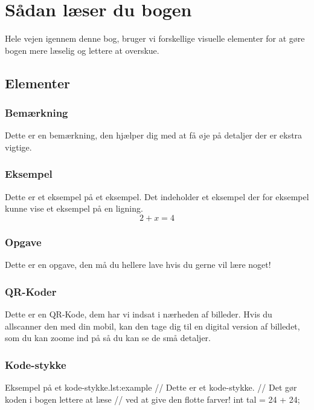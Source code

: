\cleardoublepage
\chapter{Sådan læser du bogen}
Hele vejen igennem denne bog, bruger vi forskellige visuelle elementer for at gøre bogen mere læselig og lettere at overskue.

\section{Elementer}

\subsection{Bemærkning}
\begin{remark}
	Dette er en bemærkning, den hjælper dig med at få øje på detaljer der er ekstra vigtige.
\end{remark}

\subsection{Eksempel}
\begin{example}
	Dette er et eksempel på et eksempel. Det indeholder et eksempel der for eksempel kunne vise et eksempel på en ligning. 
	$$2+x=4$$
\end{example}

\subsection{Opgave}
\begin{exercise}
	Dette er en opgave, den må du hellere lave hvis du gerne vil lære noget!
\end{exercise}

\subsection{QR-Koder}
Dette er en QR-Kode, dem har vi indsat i nærheden af billeder. Hvis du allscanner den med din mobil, kan den tage dig til en digital version af billedet, som du kan zoome ind på så du kan se de små detaljer.


\subsection{Kode-stykke}

\begin{JavaCodeH}{Eksempel på et kode-stykke.}{lst:example}
	// Dette er et kode-stykke.
	// Det gør koden i bogen lettere at læse 
	// ved at give den flotte farver!
	int tal = 24 + 24;
\end{JavaCodeH}